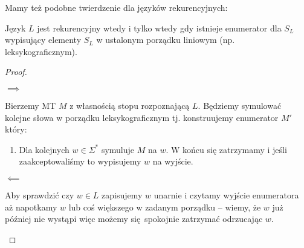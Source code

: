 Mamy też podobne twierdzenie dla języków rekurencyjnych:
\begin{theorem}
	Język \( L \) jest rekurencyjny wtedy i tylko wtedy gdy istnieje enumerator dla \( S_L \) wypisujący elementy \( S_L \) w ustalonym porządku liniowym (np. leksykograficznym).
\end{theorem}
\begin{proof}
	\begin{description}
		\item \( \implies \)

		      Bierzemy MT \( M \) z własnością stopu rozpoznającą \( L \).
		      Będziemy symulować kolejne słowa w porządku leksykograficznym tj. konstruujemy enumerator \( M' \) który:
		      \begin{enumerate}
			      \item Dla kolejnych \( w \in \Sigma^* \) symuluje \( M \) na \( w \).
			            W końcu się zatrzymamy i jeśli zaakceptowaliśmy to wypisujemy \( w \) na wyjście.
		      \end{enumerate}

		\item \( \impliedby \)

		      Aby sprawdzić czy \( w \in L \) zapisujemy \( w \) unarnie i czytamy wyjście enumeratora aż napotkamy \( w \) lub coś większego w zadanym porządku -- wiemy, że \( w \) już później nie wystąpi więc możemy się spokojnie zatrzymać odrzucając \( w \).

	\end{description}
\end{proof}